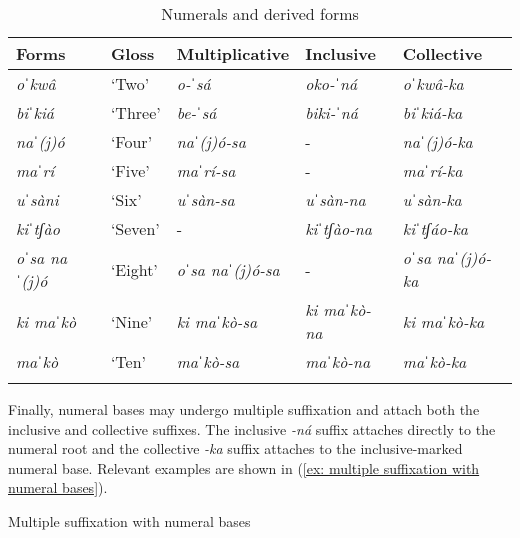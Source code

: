 \begin{table}
\caption{Numerals and derived forms}
\label{tab:numerals-derived}

\begin{tabularx}{.9\textwidth}{lllll}
\lsptoprule
\textbf{Forms}  & \textbf{Gloss} & \textbf{Multiplicative} & \textbf{Inclusive} & \textbf{Collective}\\
\midrule
\textit{oˈkwâ} & `Two' & \textit{o-ˈsá} & \textit{oko-ˈná} & \textit{oˈkwâ-ka}\\
\textit{biˈkiá} & `Three' & \textit{be-ˈsá} & \textit{biki-ˈná} & \textit{biˈkiá-ka}\\
\textit{naˈ(j)ó} & `Four' & \textit{naˈ(j)ó-sa} & - & \textit{naˈ(j)ó-ka}\\
\textit{maˈrí} & `Five' & \textit{maˈrí-sa} & - & \textit{maˈrí-ka}\\
\textit{uˈsàni} & `Six' & \textit{uˈsàn-sa} & \textit{uˈsàn-na} & \textit{uˈsàn-ka}\\
\textit{kiˈtʃào} & `Seven' & - & \textit{kiˈtʃào-na} & \textit{kiˈtʃáo-ka}\\
\textit{oˈsa naˈ(j)ó}  & `Eight' & \textit{oˈsa naˈ(j)ó-sa} & - & \textit{oˈsa naˈ(j)ó-ka}\\
\textit{ki maˈkò} & `Nine' & \textit{ki maˈkò-sa} & \textit{ki maˈkò-na} & \textit{ki maˈkò-ka}\\
\textit{maˈkò} & `Ten' & \textit{maˈkò-sa} & \textit{maˈkò-na} & \textit{maˈkò-ka}\\
\lspbottomrule
\end{tabularx}
\end{table}

Finally, numeral bases may undergo multiple suffixation and attach both the inclusive and collective suffixes. The inclusive \textit{-ná} suffix attaches directly to the numeral root and the collective \textit{-ka} suffix attaches to the inclusive-marked numeral base. Relevant examples are shown in (\ref{ex: multiple suffixation with numeral bases}).

\ea\label{ex: multiple suffixation with numeral bases}
{Multiple suffixation with numeral bases}

